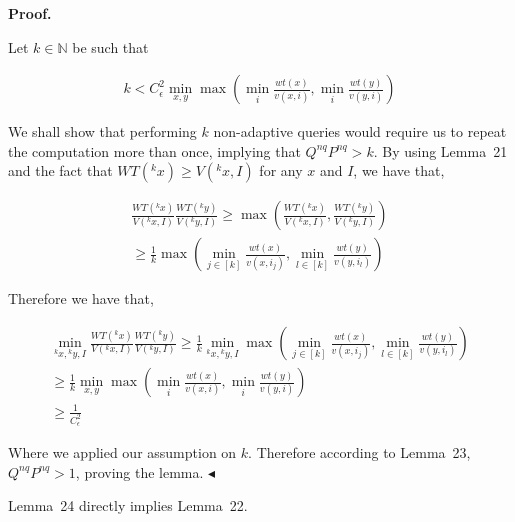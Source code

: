 \documentclass[10pt,a4paper]{article}
\begin{document}
\par\medskip\noindent\textbf{Proof.}\par




Let $k\in\mathbb{N}$ be such that\par


\[\begin{gathered}
\displaystyle k<C^{2}_{\epsilon}\min_{x,y}\max\left(\min_{i}\frac{wt(x)}{v(x,i)},\min_{i}\frac{wt(y)}{v(y,i)}\right)
\end{gathered}\]


We shall show that performing $k$ non-adaptive queries would require us to repeat the computation more than once, implying that $Q^{nq}P^{nq}>k$. By using Lemma 21 and the fact that $WT({}^{k}x)\geq V({}^{k}x,I)$ for any $x$ and $I$, we have that,\par


\[\begin{gathered}
\displaystyle\frac{WT({}^{k}x)}{V({}^{k}x,I)}\frac{WT({}^{k}y)}{V({}^{k}y,I)} \displaystyle\geq\max\left(\frac{WT({}^{k}x)}{V({}^{k}x,I)},\frac{WT({}^{k}y)}{V({}^{k}y,I)}\right) \\
\displaystyle\geq\frac{1}{k}\max\left(\min_{j\in[k]}\frac{wt(x)}{v(x,i_{j})},\min_{l\in[k]}\frac{wt(y)}{v(y,i_{l})}\right)
\end{gathered}\]


Therefore we have that,\par


\[\begin{gathered}
\displaystyle\min_{{}^{k}x,{}^{k}y,I}\frac{WT({}^{k}x)}{V({}^{k}x,I)}\frac{WT({}^{k}y)}{V({}^{k}y,I)} \displaystyle\geq\frac{1}{k}\min_{{}^{k}x,{}^{k}y,I}\max\left(\min_{j\in[k]}\frac{wt(x)}{v(x,i_{j})},\min_{l\in[k]}\frac{wt(y)}{v(y,i_{l})}\right) \\
\displaystyle\geq\frac{1}{k}\min_{x,y}\max\left(\min_{i}\frac{wt(x)}{v(x,i)},\min_{i}\frac{wt(y)}{v(y,i)}\right) \\
\displaystyle\geq\frac{1}{C^{2}_{\epsilon}}
\end{gathered}\]


Where we applied our assumption on $k$. Therefore according to Lemma 23, $Q^{nq}P^{nq}>1$, proving the lemma.
$\blacktriangleleft$\par




Lemma 24 directly implies Lemma 22.\par
\end{document}

